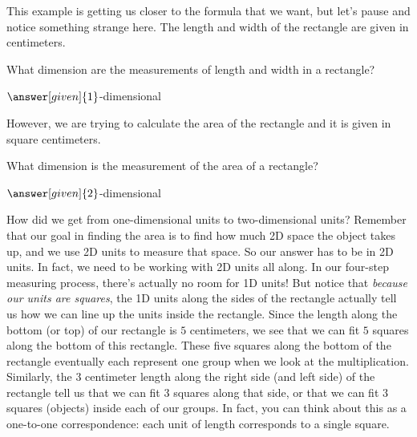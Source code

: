 \documentclass{ximera}
\begin{document}
This example is getting us closer to the formula that we want, but let's pause and notice something strange here. The length and width of the rectangle are given in centimeters.
\begin{question}
What dimension are the measurements of length and width in a rectangle?
\begin{prompt}
$\answer[given]{1}$-dimensional
\end{prompt}
\end{question}
However, we are trying to calculate the area of the rectangle and it is given in square centimeters.
\begin{question}
What dimension is the measurement of the area of a rectangle?
\begin{prompt}
$\answer[given]{2}$-dimensional
\end{prompt}
\end{question}
How did we get from one-dimensional units to two-dimensional units? Remember that our goal in finding the area is to find how much 2D space the object takes up, and we use 2D units to measure that space. So our answer has to be in 2D units. In fact, we need to be working with 2D units all along. In our four-step measuring process, there's actually no room for 1D units! But notice that \emph{because our units are squares}, the 1D units along the sides of the rectangle actually tell us how we can line up the units inside the rectangle. Since the length along the bottom (or top) of our rectangle is $5$ centimeters, we see that we can fit $5$ squares along the bottom of this rectangle. These five squares along the bottom of the rectangle eventually each represent one group when we look at the multiplication. Similarly, the $3$ centimeter length along the right side (and left side) of the rectangle tell us that we can fit $3$ squares along that side, or that we can fit $3$ squares (objects) inside each of our groups. In fact, you can think about this as a one-to-one correspondence: each unit of length corresponds to a single square.
\end{document}
